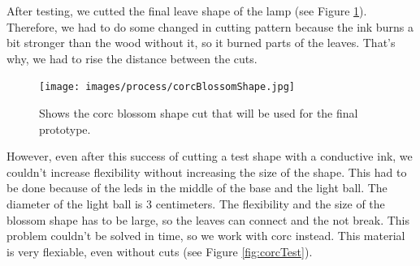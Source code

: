 \documentclass[00_doc.tex]{subfiles}
\begin{document}
    \noindent
    After testing, we cutted the final leave shape of the lamp (see Figure \ref{fig:finalLaserCut}). 
    Therefore, we had to do some changed in cutting pattern because the ink burns a bit stronger 
    than the wood without it, so it burned parts of the leaves. That's why, we had to rise the 
    distance between the cuts.   

    \begin{figure}[h!]
        \centering
        \texttt{[image: images/process/corcBlossomShape.jpg]}
        \caption{Shows the corc blossom shape cut that will be used for the final prototype.}
        \label{fig:finalLaserCut}
    \end{figure}

    \noindent
    However, even after this success of cutting a test shape with a conductive ink, we couldn't 
    increase flexibility without increasing the size of the shape. This had to be done because
    of the leds in the middle of the base and the light ball. The diameter of the light ball is
    3 centimeters. The flexibility and the size of the blossom shape has to be large, so the
    leaves can connect and the not break. This problem couldn't be solved in time, so we work
    with corc instead. This material is very flexiable, even without cuts (see Figure \ref{fig:corcTest}).\\
\end{document}
